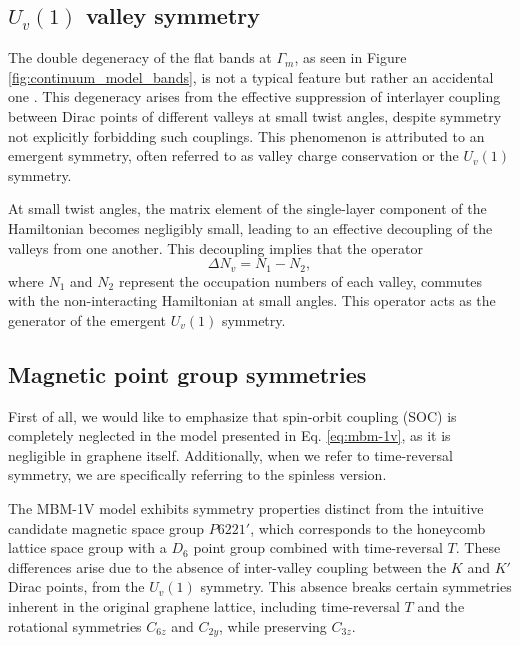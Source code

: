 \subsection{$U_v(1)$ valley symmetry} \label{subsec:Uv(1)-valley_symmetry}

The double degeneracy of the flat bands at \( \Gamma_m \), as seen in Figure \ref{fig:continuum_model_bands}, is not a typical feature but rather an accidental one \cite{thesis_angeli}. This degeneracy arises from the effective suppression of interlayer coupling between Dirac points of different valleys at small twist angles, despite symmetry not explicitly forbidding such couplings. This phenomenon is attributed to an emergent symmetry, often referred to as valley charge conservation or the \( U_v(1) \) symmetry.

At small twist angles, the matrix element of the single-layer component of the Hamiltonian becomes negligibly small, leading to an effective decoupling of the valleys from one another. This decoupling implies that the operator
\begin{equation} \label{eq:Uv(1)_symmetry_N1N2}
\Delta N_v = N_1 - N_2,
\end{equation}
where \( N_1 \) and \( N_2 \) represent the occupation numbers of each valley, commutes with the non-interacting Hamiltonian at small angles. This operator acts as the generator of the emergent \( U_v(1) \) symmetry.


\subsection{Magnetic point group symmetries} \label{subsec:magnetic_point_group_symmetries}

First of all, we would like to emphasize that spin-orbit coupling (SOC) is completely neglected in the model presented in Eq. \eqref{eq:mbm-1v}, as it is negligible in graphene itself. Additionally, when we refer to time-reversal symmetry, we are specifically referring to the spinless version.

The MBM-1V model exhibits symmetry properties distinct from the intuitive candidate magnetic space group \( P6221' \), which corresponds to the honeycomb lattice space group with a \( D_6 \) point group combined with time-reversal \( T \). These differences arise due to the absence of inter-valley coupling between the \( K \) and \( K' \) Dirac points, from the $U_v(1)$ symmetry. This absence breaks certain symmetries inherent in the original graphene lattice, including time-reversal \( T \) and the rotational symmetries \( C_{6z} \) and \( C_{2y} \), while preserving \( C_{3z} \).

